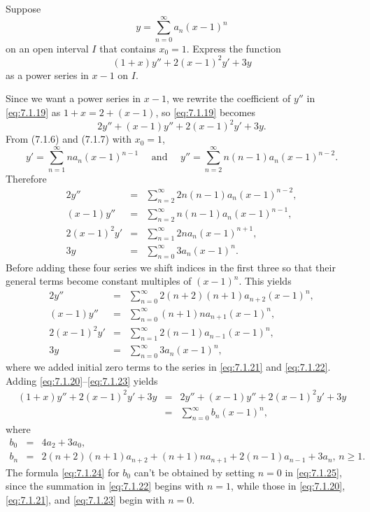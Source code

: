 \setcounter{example}{6}
\setcounter{equation}{18}
\begin{example}
  \label{example:7.1.7} \rm Suppose
  \[
    y=\sum_{n=0}^{\infty}a_{n}(x-1)^{n}
  \]
  on an open interval $I$ that contains $x_{0}=1$. Express the function
  \begin{equation}
    \label{eq:7.1.19}(1+x)y''+2(x-1)^{2}y'+3y
  \end{equation}
  as a power series in $x-1$ on $I$.
\end{example}
\setcounter{equation}{19}
\begin{examplesolution}
\solution Since we want a power series in $x-1$, we rewrite the coefficient of $y''$ in
\eqref{eq:7.1.19} as $1+x=2+(x-1)$, so \eqref{eq:7.1.19} becomes
\[
  2y''+(x-1)y''+2(x-1)^{2}y'+3y.
\]
From \textup{(7.1.6)} and \textup{(7.1.7)} with $x_{0}=1$,
\[
  y'=\sum_{n=1}^{\infty}na_{n}(x-1)^{n-1}\quad\mbox{ and }\quad y''=\sum_{n=2}^{\infty}n(n-1)a_{n}(x-1)^{n-2}.
\]
Therefore
\begin{eqnarray*}
  2y''         & = & \sum_{n=2}^{\infty}2n(n-1)a_{n}(x-1)^{n-2}, \\
  (x-1)y''     & = & \sum_{n=2}^{\infty}n(n-1)a_{n}(x-1)^{n-1},  \\
  2(x-1)^{2}y' & = & \sum_{n=1}^{\infty}2na_{n}(x-1)^{n+1},      \\
  3y           & = & \sum_{n=0}^{\infty}3a_{n}(x-1)^{n}.
\end{eqnarray*}
Before adding these four series we shift indices in the first three so that their general terms
become constant multiples of $(x-1)^{n}$. This yields
\begin{eqnarray}
  2y ''&=&\sum_{n=0}^\infty 2(n+2)(n+1)a_{n+2}(x-1)^n,\label{eq:7.1.20}\\ (x-1)y''&=&\sum_{n=0}^\infty (n+1)na_{n+1}(x-1)^n, \label{eq:7.1.21}\\ 2(x-1)^2y'&=&\sum_{n=1}^\infty 2(n-1)a_{n-1}(x-1)^n,\label{eq:7.1.22}\\
  3y&=&\sum_{n=0}^\infty 3a_n (x-1)^n, \label{eq:7.1.23}
\end{eqnarray}
where we added initial zero terms to the series in \eqref{eq:7.1.21} and \eqref{eq:7.1.22}. Adding
\eqref{eq:7.1.20}--\eqref{eq:7.1.23} yields
\begin{eqnarray*}
  (1+x)y''+2(x-1)^{2}y'+3y & = & 2y''+(x-1)y''+2(x-1)^{2}y'+3y \\[5pt]
                           & = & \sum_{n=0}^{\infty}b_{n}(x-1)^{n},
\end{eqnarray*}
where
\begin{eqnarray}
  b_{0} & = & 4a_{2}+3a_{0},\label{eq:7.1.24} \\
  b_{n} & = & 2(n+2)(n+1)a_{n+2}+(n+1)na_{n+1}+2(n-1)a_{n-1}+3a_{n},\,n\ge1\label{eq:7.1.25}.
\end{eqnarray}
The formula \eqref{eq:7.1.24} for $b_{0}$ can't be obtained by setting $n=0$ in \eqref{eq:7.1.25},
since the summation in \eqref{eq:7.1.22} begins with $n=1$, while those in \eqref{eq:7.1.20},
\eqref{eq:7.1.21}, and \eqref{eq:7.1.23} begin with $n=0$.
\end{examplesolution}

